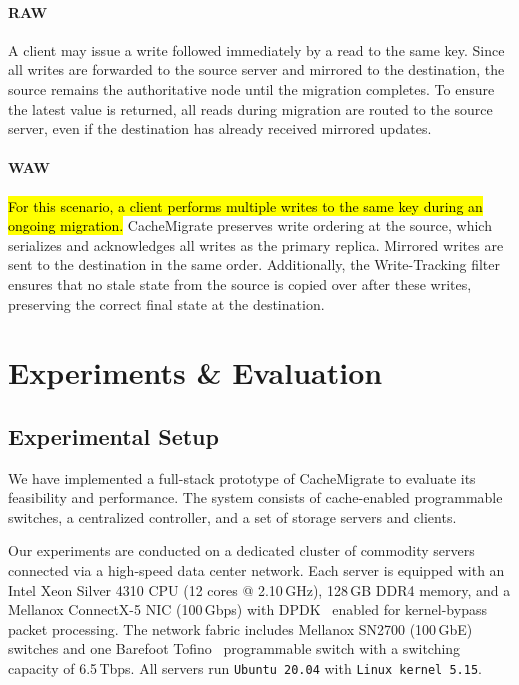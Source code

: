 \documentclass[conference]{IEEEtran}
\DeclareRobustCommand{\hlme}[1]{{\sethlcolor{white}\hl{#1}}}
\begin{document}
\paragraph{RAW}
A client may issue a write followed immediately by a read to the same key. Since all writes are forwarded to the source server and mirrored to the destination, the source remains the authoritative node until the migration completes. To ensure the latest value is returned, all reads during migration are routed to the source server, even if the destination has already received mirrored updates.

\paragraph{WAW}
\hlme{For this scenario, a client performs multiple writes to the same key during an ongoing migration.} CacheMigrate preserves write ordering at the source, which serializes and acknowledges all writes as the primary replica. Mirrored writes are sent to the destination in the same order. Additionally, the Write-Tracking filter ensures that no stale state from the source is copied over after these writes, preserving the correct final state at the destination.


\section{Experiments \& Evaluation}
\label{sec:Experimental}

\subsection{Experimental Setup}

We have implemented a full-stack prototype of CacheMigrate to evaluate its feasibility and performance. The system consists of cache-enabled programmable switches, a centralized controller, and a set of storage servers and clients.

Our experiments are conducted on a dedicated cluster of commodity servers connected via a high-speed data center network. Each server is equipped with an Intel Xeon Silver 4310 CPU (12 cores @ 2.10\,GHz), 128\,GB DDR4 memory, and a Mellanox ConnectX-5 NIC (100\,Gbps) with DPDK~\cite{dpdkDPDKx2013} enabled for kernel-bypass packet processing. The network fabric includes Mellanox SN2700 (100\,GbE) switches and one Barefoot Tofino~\cite{tofino} programmable switch with a switching capacity of 6.5\,Tbps. All servers run \texttt{Ubuntu~20.04} with \texttt{Linux kernel~5.15}.
\end{document}
